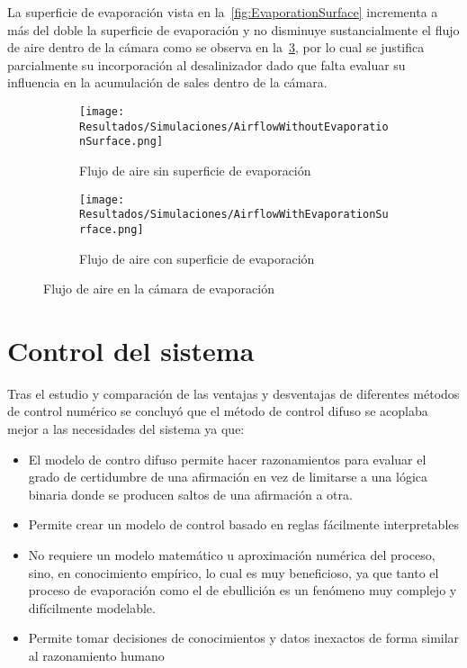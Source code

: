 				La superficie de evaporación vista en la~\cref{fig:EvaporationSurface} incrementa a más del doble la superficie de evaporación y no disminuye sustancialmente el flujo de aire dentro de la cámara como se observa en la~\cref{fig:AirflowInEvaporationChamber}, por lo cual se justifica parcialmente su incorporación al desalinizador dado que falta evaluar su influencia en la acumulación de sales dentro de la cámara.
				
				\begin{figure}[H]
					\centering
					\begin{subfigure}[t]{0.45\linewidth}
						\centering
						\texttt{[image: Resultados/Simulaciones/AirflowWithoutEvaporationSurface.png]}
						\caption{Flujo de aire sin superficie de evaporación}
						\label{fig:AirflowWithoutEvaporationSurface}
					\end{subfigure}
					\hfill
					\begin{subfigure}[t]{0.45\linewidth}
						\centering
						\texttt{[image: Resultados/Simulaciones/AirflowWithEvaporationSurface.png]}
						\caption{Flujo de aire con superficie de evaporación}
						\label{fig:AirflowWithEvaporationSurface}
					\end{subfigure}
					\caption{Flujo de aire en la cámara de evaporación}
					\label{fig:AirflowInEvaporationChamber}
				\end{figure}
		
			
				
				
	\section{Control del sistema}
	
		Tras el estudio y comparación de las ventajas y desventajas de diferentes métodos de control numérico se concluyó que el método de control difuso se acoplaba mejor a las necesidades del sistema ya que:
		
		\begin{itemize}
			\item El modelo de contro difuso permite hacer razonamientos para evaluar el grado de certidumbre de una afirmación en vez de limitarse a una lógica binaria donde se producen saltos de una afirmación a otra.
			\item Permite crear un modelo de control basado en reglas fácilmente interpretables
			\item No requiere un modelo matemático u aproximación numérica del proceso, sino, en conocimiento empírico, lo cual es muy beneficioso, ya que tanto el proceso de evaporación como el de ebullición es un fenómeno muy complejo y difícilmente modelable.
			\item Permite tomar decisiones de conocimientos y datos inexactos de forma similar al razonamiento humano
		\end{itemize}
		
